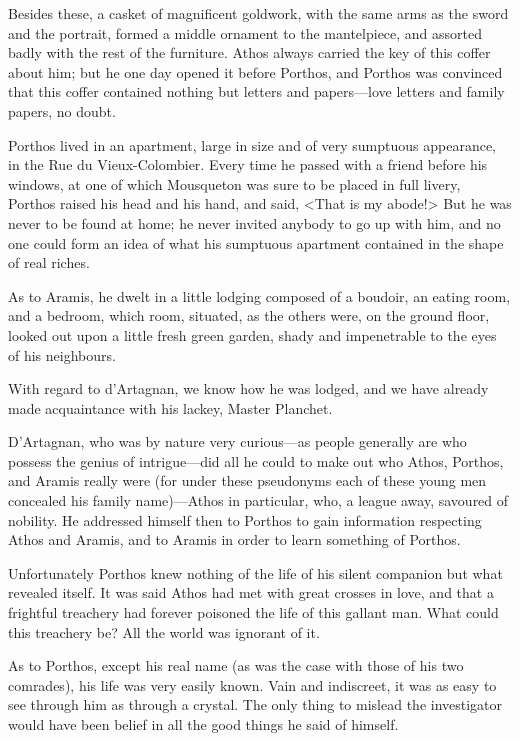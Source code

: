 Besides these, a casket of magnificent goldwork, with the same arms as the sword and the portrait, formed a middle ornament to the mantelpiece, and assorted badly with the rest of the furniture. Athos always carried the key of this coffer about him; but he one day opened it before Porthos, and Porthos was convinced that this coffer contained nothing but letters and papers---love letters and family papers, no doubt. 

Porthos lived in an apartment, large in size and of very sumptuous appearance, in the Rue du Vieux-Colombier. Every time he passed with a friend before his windows, at one of which Mousqueton was sure to be placed in full livery, Porthos raised his head and his hand, and said, <That is my abode!> But he was never to be found at home; he never invited anybody to go up with him, and no one could form an idea of what his sumptuous apartment contained in the shape of real riches. 

As to Aramis, he dwelt in a little lodging composed of a boudoir, an eating room, and a bedroom, which room, situated, as the others were, on the ground floor, looked out upon a little fresh green garden, shady and impenetrable to the eyes of his neighbours. 

With regard to d'Artagnan, we know how he was lodged, and we have already made acquaintance with his lackey, Master Planchet. 

D'Artagnan, who was by nature very curious---as people generally are who possess the genius of intrigue---did all he could to make out who Athos, Porthos, and Aramis really were (for under these pseudonyms each of these young men concealed his family name)---Athos in particular, who, a league away, savoured of nobility. He addressed himself then to Porthos to gain information respecting Athos and Aramis, and to Aramis in order to learn something of Porthos. 

Unfortunately Porthos knew nothing of the life of his silent companion but what revealed itself. It was said Athos had met with great crosses in love, and that a frightful treachery had forever poisoned the life of this gallant man. What could this treachery be? All the world was ignorant of it. 

As to Porthos, except his real name (as was the case with those of his two comrades), his life was very easily known. Vain and indiscreet, it was as easy to see through him as through a crystal. The only thing to mislead the investigator would have been belief in all the good things he said of himself. 

